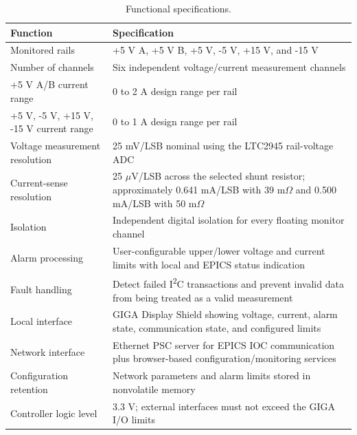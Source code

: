 \begin{table}[H]
    \centering
    \caption{Functional specifications.}
    \label{tab:functional-specifications}
    \begin{tabularx}{\textwidth}{>{\raggedright\arraybackslash}p{}X}
        \toprule
        \textbf{Function} & \textbf{Specification} \\
        \midrule
        Monitored rails & +5 V A, +5 V B, +5 V, -5 V, +15 V, and -15 V \\
        Number of channels & Six independent voltage/current measurement channels \\
        +5 V A/B current range & 0 to 2 A design range per rail \\
        +5 V, -5 V, +15 V, -15 V current range & 0 to 1 A design range per rail \\
        Voltage measurement resolution & 25 mV/LSB nominal using the LTC2945 rail-voltage ADC \\
        Current-sense resolution & 25 \(\mu\)V/LSB across the selected shunt resistor; approximately 0.641 mA/LSB with 39 m\(\Omega\) and 0.500 mA/LSB with 50 m\(\Omega\) \\
        Isolation & Independent digital isolation for every floating monitor channel \\
        Alarm processing & User-configurable upper/lower voltage and current limits with local and EPICS status indication \\
        Fault handling & Detect failed I\textsuperscript{2}C transactions and prevent invalid data from being treated as a valid measurement \\
        Local interface & GIGA Display Shield showing voltage, current, alarm state, communication state, and configured limits \\
        Network interface & Ethernet PSC server for EPICS IOC communication plus browser-based configuration/monitoring services \\
        Configuration retention & Network parameters and alarm limits stored in nonvolatile memory \\
        Controller logic level & 3.3 V; external interfaces must not exceed the GIGA I/O limits \\
        \bottomrule
    \end{tabularx}
\end{table}

